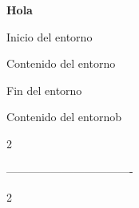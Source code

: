 \documentclass{article}
\begin{document}
\begingroup  
\bfseries Hola
\endgroup


\newenvironment{mientornoa}{
  Inicio del entorno
}{
  Fin del entorno
}

\begin{mientornoa}

  Contenido del entorno

\end{mientornoa}

\newenvironment{mientornob}{
  \begin{center}
    
}{
  \end{center}
}

\begin{mientornob}

  Contenido del entornob

\end{mientornob}


\newenvironment{mientornoc}[1]{
  \begin{multicols}{#1}
    
}{
  \end{multicols}
}

\begin{mientornoc}{2}

  \lipsum[1]

\end{mientornoc}


\newenvironment{mientornod}[1][2]{
  \begin{multicols}{#1}
    
}{
  \end{multicols}
}

----------------------------------

\begin{mientornod}

  \lipsum[1]

\end{mientornod}
\end{document}
